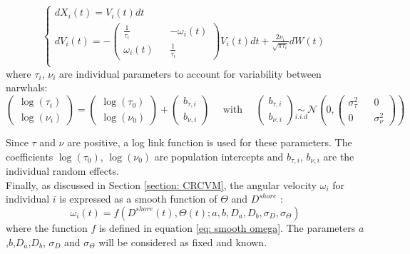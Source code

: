 \documentclass[aoas]{imsart}
\theoremstyle{definition}
\theoremstyle{remark}
\theoremstyle{remark}
\newcommand {\1}{\mathbb{1}}
\begin{document}
\begin{equation}  %
	\left\{
	\begin{array}{l}
		dX_i(t)=V_i(t)dt  \\
		dV_i(t)=-\begin{pmatrix} 
			\frac{1}{\tau_i} && -\omega_i(t) \\
			\omega_i(t) && \frac{1}{\tau_i}
		\end{pmatrix}V_i(t)dt+\frac{2\nu_i}{\sqrt{\pi \tau_i}} dW(t) \\
	\end{array}
	\right.
	\label{eq:baseline latent processes}
\end{equation}
%
where $\tau_i$, $\nu_i$ are individual parameters   to account for variability between narwhals:
%
\begin{equation}   
	\begin{pmatrix}	\log(\tau_i)\\ \log(\nu_i) \end{pmatrix}
	= \begin{pmatrix}\log(\tau_0)\\ \log(\nu_0) \end{pmatrix}
	+
	\begin{pmatrix} b_{\tau,i}\\  b_{\nu,i}  \end{pmatrix}
	\quad \mbox{ with } \quad
	\begin{pmatrix} b_{\tau,i} \\ b_{\nu,i} \end{pmatrix} \underset{i.i.d}{\sim} \mathcal{N}\left(0,\begin{pmatrix} \sigma_{\tau}^2 && 0 \\ 0 && \sigma_{\nu}^2 \end{pmatrix}\right) 
	\label{eq:baseline random effects}
\end{equation}

Since $\tau$ and $\nu$ are positive, a log link function is used for these parameters. The coefficients $\log(\tau_{0})$, $\log(\nu_{0})$ are population intercepts and $b_{\tau,i}$, $b_{\nu,i}$
are the individual random effects. \\

Finally, as discussed in Section \ref{section: CRCVM}, the angular velocity $\omega_i$ for individual $i$ is expressed as a smooth function of $\Theta$ and $D^{shore}$ : 
%
\begin{equation} 
	\omega_i(t)=f(D^{shore}(t),\Theta(t);a,b,D_a,D_b,\sigma_D,\sigma_\Theta)
\end{equation}
where the function $f$ is defined in equation \eqref{eq: smooth omega}. The parameters $a$,$b$,$D_a$,$D_b$, $\sigma_D$ and $\sigma_\Theta$ will be considered as fixed and known.
\\
\end{document}
